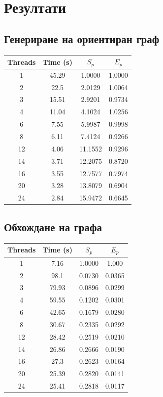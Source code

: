 \section{Резултати}

\subsection*{Генериране на ориентиран граф}

\begin{tabular}{|c|c|c|c|}
\hline
Threads & Time (s) & $S_p$ & $E_p$\\
\hline \hline
1	& 45.29  & 1.0000  & 1.0000 \\
\hline
2	& 22.5   & 2.0129  & 1.0064 \\
\hline
3	& 15.51  & 2.9201  & 0.9734 \\
\hline
4	& 11.04  & 4.1024  & 1.0256 \\
\hline
6	& 7.55   & 5.9987  & 0.9998 \\
\hline
8	& 6.11   & 7.4124  & 0.9266 \\
\hline
12	& 4.06   & 11.1552 & 0.9296 \\
\hline
14	& 3.71   & 12.2075 & 0.8720 \\
\hline
16	& 3.55   & 12.7577 & 0.7974 \\
\hline
20	& 3.28   & 13.8079 & 0.6904 \\
\hline
24	& 2.84   & 15.9472 & 0.6645 \\
\hline
\end{tabular}

\subsection*{Обхождане на графа}

\begin{tabular}{|c|c|c|c|}
\hline
Threads & Time (s) & $S_p$ & $E_p$\\
\hline \hline
1	& 7.16   & 1.0000 & 1.000 \\
\hline
2	& 98.1   & 0.0730 & 0.0365 \\
\hline
3	& 79.93  & 0.0896 & 0.0299 \\
\hline
4	& 59.55  & 0.1202 & 0.0301 \\
\hline
6	& 42.65  & 0.1679 & 0.0280 \\
\hline
8	& 30.67  & 0.2335 & 0.0292 \\
\hline
12	& 28.42  & 0.2519 & 0.0210 \\
\hline
14	& 26.86  & 0.2666 & 0.0190 \\
\hline
16	& 27.3   & 0.2623 & 0.0164 \\
\hline
20	& 25.39  & 0.2820 & 0.0141 \\
\hline
24	& 25.41  & 0.2818 & 0.0117 \\
\hline
\end{tabular}

